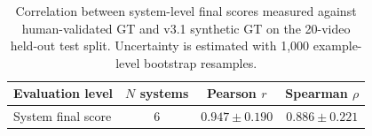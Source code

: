 \begin{table}[t]
\centering
\caption{Correlation between system-level final scores measured against human-validated GT and v3.1 synthetic GT on the 20-video held-out test split. Uncertainty is estimated with 1,000 example-level bootstrap resamples.}
\label{tab:synth-human-correlation}
\begin{tabular}{lccc}
\toprule
Evaluation level & $N$ systems & Pearson $r$ & Spearman $\rho$ \\
\midrule
System final score & 6 & $0.947 \pm 0.190$ & $0.886 \pm 0.221$ \\
\bottomrule
\end{tabular}
\end{table}
